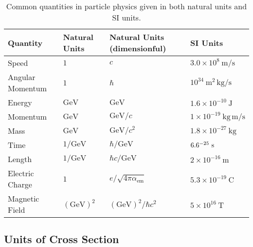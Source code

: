\begin{table}[htpb]
 \centering
 \caption{Common quantities in particle physics given in both natural units and SI units.}
 \begin{tabular}{@{}llll@{}} \toprule
  Quantity         & Natural Units                 & Natural Units (dimensionful)            & SI Units                                              \\ \midrule
  Speed            & $1$                           & $c$                                     & $3.0\times 10^{8}~\mathrm{m}/\mathrm{s}$              \\
  Angular Momentum & $1$                           & $\hbar$                                 & $10^{34}~\mathrm{m}^2 \,\mathrm{kg}/\mathrm{s}$       \\
  Energy           & $\mathrm{GeV}$                & $\mathrm{GeV}$                          & $1.6\times 10^{-10}~\mathrm{J}$                       \\
  Momentum         & $\mathrm{GeV}$                & $\mathrm{GeV}/c$                        & $1\times 10^{-19}~\mathrm{kg}\,\mathrm{m}/\mathrm{s}$ \\
  Mass             & $\mathrm{GeV}$                & $\mathrm{GeV}/c^{2}$                    & $1.8\times 10^{-27}~\mathrm{kg}$                      \\
  Time             & $1/\mathrm{GeV}$              & $\hbar/\mathrm{GeV}$                    & $6.6\time 10^{-25}~\mathrm{s}$                        \\
  Length           & $1/\mathrm{GeV}$              & $\hbar c/\mathrm{GeV}$                  & $2\times 10^{-16}~\mathrm{m}$                         \\
  Electric Charge  & $1$                           & $e/\sqrt{4\pi \alpha_{\mathrm{em}}}$    & $5.3\times 10^{-19}~\mathrm{C}$                       \\
  Magnetic Field   & $\left(\mathrm{GeV}\right)^2$ & $\left(\mathrm{GeV}\right)^2/\hbar c^2$ & $5\times 10^{16}~\mathrm{T}$                          \\
  \bottomrule
 \end{tabular}\label{table:natural_units}%
\end{table}

\subsection{Units of Cross Section}\label{subsection:cross_section}

